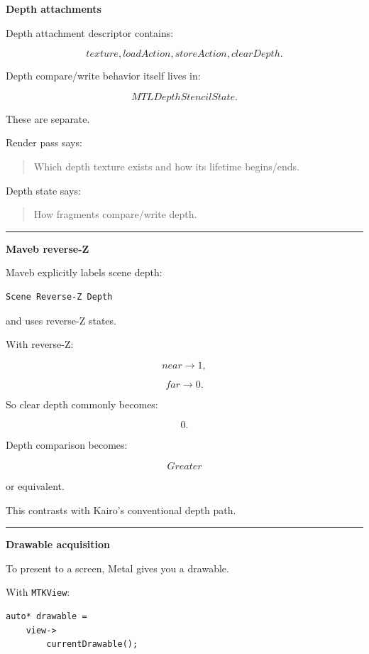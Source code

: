 \textbf{Depth attachments}

Depth attachment descriptor contains:

\[
texture,
loadAction,
storeAction,
clearDepth.
\]

Depth compare/write behavior itself lives in:

\[
MTLDepthStencilState.
\]

These are separate.

Render pass says:

\begin{quote}
Which depth texture exists and how its lifetime begins/ends.
\end{quote}

Depth state says:

\begin{quote}
How fragments compare/write depth.
\end{quote}

\begin{center}\rule{0.5\linewidth}{0.5pt}\end{center}

\textbf{Maveb reverse-Z}

Maveb explicitly labels scene depth:

\begin{verbatim}
Scene Reverse-Z Depth
\end{verbatim}

and uses reverse-Z states.

With reverse-Z:

\[
near\rightarrow1,
\]

\[
far\rightarrow0.
\]

So clear depth commonly becomes:

\[
0.
\]

Depth comparison becomes:

\[
Greater
\]

or equivalent.

This contrasts with Kairo's conventional depth path.

\begin{center}\rule{0.5\linewidth}{0.5pt}\end{center}

\textbf{Drawable acquisition}

To present to a screen, Metal gives you a drawable.

With \texttt{MTKView}:

\begin{verbatim}
auto* drawable =
    view->
        currentDrawable();
\end{verbatim}

